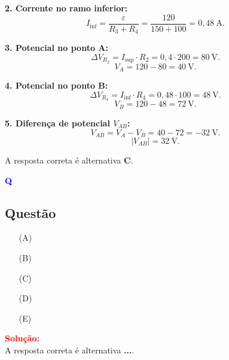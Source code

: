 \begin{flushleft}
\textbf{2. Corrente no ramo inferior:}
\[
I_{\text{inf}} = \frac{\varepsilon}{R_3 + R_4} = \frac{120}{150 + 100} = 0{,}48 \ \text{A}.
\]

\textbf{3. Potencial no ponto A:}
\[
\Delta V_{R_2} = I_{\text{sup}} \cdot R_2 = 0{,}4 \cdot 200 = 80 \ \text{V}.
\]
\[
V_A = 120 - 80 = 40 \ \text{V}.
\]

\textbf{4. Potencial no ponto B:}
\[
\Delta V_{R_4} = I_{\text{inf}} \cdot R_4 = 0{,}48 \cdot 100 = 48 \ \text{V}.
\]
\[
V_B = 120 - 48 = 72 \ \text{V}.
\]

\textbf{5. Diferença de potencial $V_{AB}$:}
\[
V_{AB} = V_A - V_B = 40 - 72 = -32 \ \text{V}.
\]
\[
|V_{AB}| = 32 \ \text{V}.
\]

A resposta correta é alternativa \colorbox{green!50}{\textbf{C}}.
\end{flushleft}



\begin{flushleft}
\textbf{\textcolor{blue}{\Large Q}}\\
\noindent

\subsection{Quest\~ao }

\begin{itemize}
\item[(A)] 
\item[(B)] 
\item[(C)] 
\item[(D)] 
\item[(E)] 
\end{itemize}

\vspace{0.5cm}

\textcolor{red}{\textbf{Solução:}}\\

A resposta correta é alternativa \colorbox{green!50}{\textbf{...}}.
\end{flushleft}